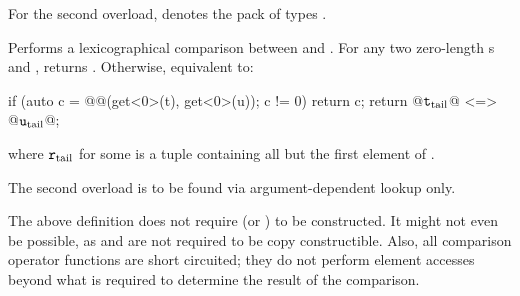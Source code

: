 \documentclass{wg21}
\begin{document}
\begin{itemdescr}

    \begin{addedblock}
        For the second overload,  denotes the pack of types .
    \end{addedblock}

    \pnum
    \effects
    Performs a lexicographical comparison between  and .
    For any two zero-length s  and ,
     returns .
    Otherwise, equivalent to:
    \begin{codeblock}
        if (auto c = @@(get<0>(t), get<0>(u)); c != 0) return c;
        return @$\texttt{t}_\mathrm{tail}$@ <=> @$\texttt{u}_\mathrm{tail}$@;
    \end{codeblock}
    where $\texttt{r}_\mathrm{tail}$ for some  
    is a tuple containing all but the first element of .

    \begin{addedblock}
        \remarks The second overload is to be found via argument-dependent lookup only.
    \end{addedblock}
\end{itemdescr}


\pnum
\begin{note}
    The above definition does not require 
    (or ) to be constructed. It might not
    even be possible, as  and  are not required to be copy
    constructible. Also, all comparison operator functions are short circuited;
    they do not perform element accesses beyond what is required to determine the
    result of the comparison.
\end{note}
\end{document}
